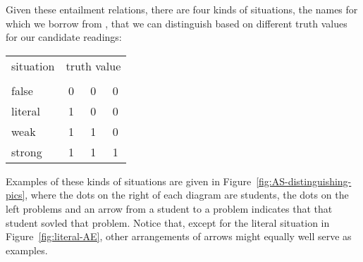 \documentclass[fleqn,reqno,10pt,draft]{article}
\newcommand{\lit}{\acro{lit}}
\newcommand{\glb}{\acro{glb}}
\newcommand{\loc}{\acro{loc}}
\begin{document}
Given these entailment relations, there are four kinds of situations,
the names for which we borrow from
\citet{ChemlaSpector2010:Experimental-Ev}, that we can distinguish
based on different truth values for our candidate readings:

\begin{center}
  \begin{tabular}{lccc}
    \toprule
    situation    & \multicolumn{3}{c}{truth value} 
  \\ 
  \cmidrule(r){2-4}
     & \lit & \glb & \loc \\ \midrule
    false   & 0 & 0 & 0 \\
    literal & 1 & 0 & 0 \\
    weak    & 1 & 1 & 0 \\
    strong  & 1 & 1 & 1 \\ \bottomrule
  \end{tabular}
\end{center}

\noindent Examples of these kinds of situations are given in
Figure~\ref{fig:AS-distinguishing-pics}, where the dots on the right
of each diagram are students, the dots on the left problems and an
arrow from a student to a problem indicates that that student sovled
that problem. Notice that, except for the literal
situation in
Figure~\ref{fig:literal-AE},
other arrangements of arrows might equally well serve as examples.
\end{document}
